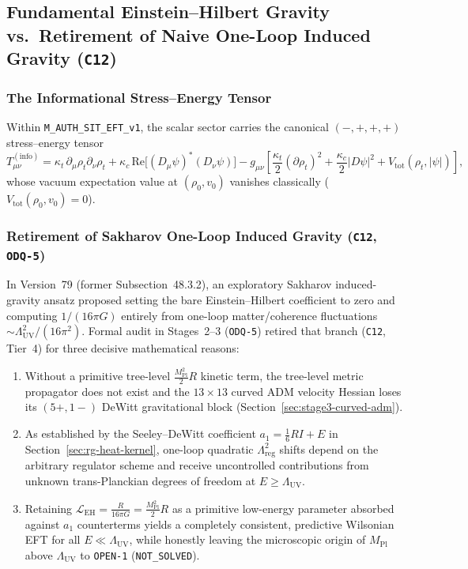 \subsection{Fundamental Einstein--Hilbert Gravity vs.\ Retirement of Naive One-Loop Induced Gravity (\texttt{C12})}

\subsubsection{The Informational Stress--Energy Tensor}

Within \texttt{M\_AUTH\_SIT\_EFT\_v1}, the scalar sector carries the canonical $(-,+,+,+)$ stress--energy tensor
\begin{equation}
T_{\mu\nu}^{(\mathrm{info})}
= \kappa_t\,\partial_\mu\rho_t\partial_\nu\rho_t
  + \kappa_c\,\mathrm{Re}\bigl[(D_\mu\psi)^*(D_\nu\psi)\bigr]
  - g_{\mu\nu}\left[\frac{\kappa_t}{2}(\partial\rho_t)^2 + \frac{\kappa_c}{2}|D\psi|^2 + V_{\mathrm{tot}}(\rho_t,|\psi|)\right],
\label{eq:info_tension_tensor_consolidated}
\end{equation}
whose vacuum expectation value at $(\rho_0, v_0)$ vanishes classically ($V_{\mathrm{tot}}(\rho_0, v_0) = 0$).

\subsubsection{Retirement of Sakharov One-Loop Induced Gravity (\texttt{C12}, \texttt{ODQ-5})}

In Version~79 (former Subsection~48.3.2), an exploratory Sakharov induced-gravity ansatz proposed setting the bare Einstein--Hilbert coefficient to zero and computing $1/(16\pi G)$ entirely from one-loop matter/coherence fluctuations $\sim \Lambda_{\mathrm{UV}}^2/(16\pi^2)$. Formal audit in Stages~2--3 (\texttt{ODQ-5}) retired that branch (\texttt{C12}, Tier~4) for three decisive mathematical reasons:
\begin{enumerate}[leftmargin=2em]
  \item Without a primitive tree-level $\frac{M_{\mathrm{Pl}}^2}{2}R$ kinetic term, the tree-level metric propagator does not exist and the $13\times 13$ curved ADM velocity Hessian loses its $(5+,1-)$ DeWitt gravitational block (Section~\ref{sec:stage3-curved-adm}).
  \item As established by the Seeley--DeWitt coefficient $a_1 = \frac{1}{6}R I + E$ in Section~\ref{sec:rg-heat-kernel}, one-loop quadratic $\Lambda_{\mathrm{reg}}^2$ shifts depend on the arbitrary regulator scheme and receive uncontrolled contributions from unknown trans-Planckian degrees of freedom at $E \ge \Lambda_{\mathrm{UV}}$.
  \item Retaining $\mathcal{L}_{\mathrm{EH}} = \frac{R}{16\pi G} = \frac{M_{\mathrm{Pl}}^2}{2}R$ as a primitive low-energy parameter absorbed against $a_1$ counterterms yields a completely consistent, predictive Wilsonian EFT for all $E \ll \Lambda_{\mathrm{UV}}$, while honestly leaving the microscopic origin of $M_{\mathrm{Pl}}$ above $\Lambda_{\mathrm{UV}}$ to \texttt{OPEN-1} (\texttt{NOT\_SOLVED}).
\end{enumerate}


